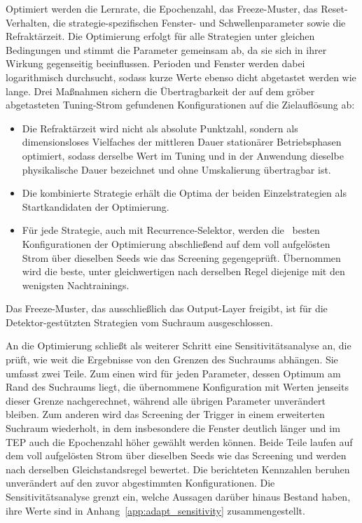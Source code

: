 Optimiert werden die Lernrate, die Epochenzahl, das Freeze-Muster, das Reset-Verhalten, die strategie-spezifischen Fenster- und Schwellenparameter sowie die Refraktärzeit. Die Optimierung erfolgt für alle Strategien unter gleichen Bedingungen und stimmt die Parameter gemeinsam ab, da sie sich in ihrer Wirkung gegenseitig beeinflussen. Perioden und Fenster werden dabei logarithmisch durchsucht, sodass kurze Werte ebenso dicht abgetastet werden wie lange. Drei Maßnahmen sichern die Übertragbarkeit der auf dem gröber abgetasteten Tuning-Strom gefundenen Konfigurationen auf die Zielauflösung ab: 
%
\begin{itemize}
    \item Die Refraktärzeit wird nicht als absolute Punktzahl, sondern als dimensionsloses Vielfaches der mittleren Dauer stationärer Betriebsphasen optimiert, sodass derselbe Wert im Tuning und in der Anwendung dieselbe physikalische Dauer bezeichnet und ohne Umskalierung übertragbar ist.
    \item Die kombinierte Strategie erhält die Optima der beiden Einzelstrategien als Startkandidaten der Optimierung.
    \item Für jede Strategie, auch mit Recurrence-Selektor, werden die \paramAdaptTopK\ besten Konfigurationen der Optimierung abschließend auf dem voll aufgelösten Strom über dieselben Seeds wie das Screening gegengeprüft. Übernommen wird die beste, unter gleichwertigen nach derselben Regel diejenige mit den wenigsten Nachtrainings.
\end{itemize}
%
Das Freeze-Muster, das ausschließlich das Output-Layer freigibt, ist für die Detektor-gestützten Strategien vom Suchraum ausgeschlossen. \par
%
An die Optimierung schließt als weiterer Schritt eine Sensitivitätsanalyse an, die prüft, wie weit die Ergebnisse von den Grenzen des Suchraums abhängen. Sie umfasst zwei Teile. Zum einen wird für jeden Parameter, dessen Optimum am Rand des Suchraums liegt, die übernommene Konfiguration mit Werten jenseits dieser Grenze nachgerechnet, während alle übrigen Parameter unverändert bleiben. Zum anderen wird das Screening der Trigger in einem erweiterten Suchraum wiederholt, in dem insbesondere die Fenster deutlich länger und im \ac{TEP} auch die Epochenzahl höher gewählt werden können. Beide Teile laufen auf dem voll aufgelösten Strom über dieselben Seeds wie das Screening und werden nach derselben Gleichstandsregel bewertet. Die berichteten Kennzahlen beruhen unverändert auf den zuvor abgestimmten Konfigurationen. Die Sensitivitätsanalyse grenzt ein, welche Aussagen darüber hinaus Bestand haben, ihre Werte sind in Anhang~\ref{app:adapt_sensitivity} zusammengestellt. \par
